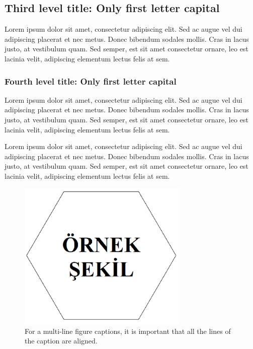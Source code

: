 \subsection{Third level title: Only first letter capital}

Lorem ipsum dolor sit amet, consectetur adipiscing elit. Sed ac augue vel dui 
adipiscing placerat et nec metus. Donec bibendum sodales mollis. Cras in lacus 
justo, at vestibulum quam. Sed semper, est sit amet consectetur ornare, leo est 
lacinia velit, adipiscing elementum lectus felis at sem.

\subsubsection{Fourth level title: Only first letter capital}

Lorem ipsum dolor sit amet, consectetur adipiscing elit. Sed ac augue vel dui 
adipiscing placerat et nec metus. Donec bibendum sodales mollis. Cras in lacus 
justo, at vestibulum quam. Sed semper, est sit amet consectetur ornare, leo est 
lacinia velit, adipiscing elementum lectus felis at sem.


Lorem ipsum dolor sit amet, consectetur adipiscing elit. Sed ac augue vel dui 
adipiscing placerat et nec metus. Donec bibendum sodales mollis. Cras in lacus 
justo, at vestibulum quam. Sed semper, est sit amet consectetur ornare, leo est 
lacinia velit, adipiscing elementum lectus felis at sem.

\begin{figure}
 \centering
 \includegraphics[width=230pt,keepaspectratio=true]{./fig/sekil6}
 \caption{For a multi-line figure captions, it is important that all the
  lines of the caption are aligned.}
 \label{fig:4-1}
\end{figure}

